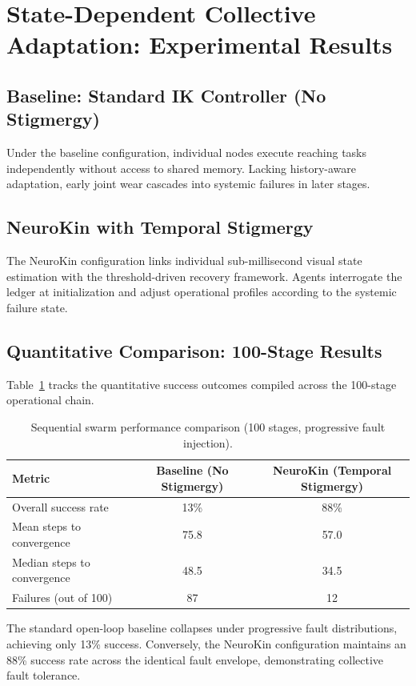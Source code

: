 \documentclass[12pt,a4paper,oneside]{report}
\begin{document}
\section{State-Dependent Collective Adaptation: Experimental Results}
\label{sec:swarm_results}

\subsection{Baseline: Standard IK Controller (No Stigmergy)}
Under the baseline configuration, individual nodes execute reaching tasks independently without access to shared memory. Lacking history-aware adaptation, early joint wear cascades into systemic failures in later stages.

\subsection{NeuroKin with Temporal Stigmergy}
The NeuroKin configuration links individual sub-millisecond visual state estimation with the threshold-driven recovery framework. Agents interrogate the ledger at initialization and adjust operational profiles according to the systemic failure state.

\subsection{Quantitative Comparison: 100-Stage Results}
Table~\ref{tab:swarm_results} tracks the quantitative success outcomes compiled across the 100-stage operational chain.

\begin{table}[H]
\centering
\caption{Sequential swarm performance comparison (100 stages, progressive fault injection).}
\label{tab:swarm_results}
\begin{tabular}{lcc}
\toprule
\textbf{Metric} & \textbf{Baseline (No Stigmergy)} & \textbf{NeuroKin (Temporal Stigmergy)} \\
\midrule
Overall success rate & 13\% & 88\% \\
Mean steps to convergence & 75.8 & 57.0 \\
Median steps to convergence & 48.5 & 34.5 \\
Failures (out of 100) & 87 & 12 \\
\bottomrule
\end{tabular}
\end{table}

The standard open-loop baseline collapses under progressive fault distributions, achieving only 13\% success. Conversely, the NeuroKin configuration maintains an 88\% success rate across the identical fault envelope, demonstrating collective fault tolerance.
\end{document}

